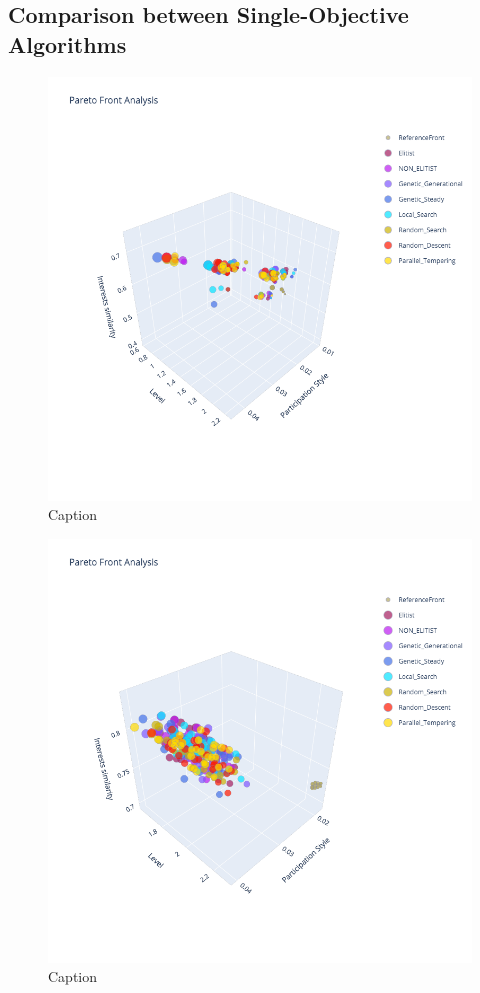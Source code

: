 \subsection{Comparison between Single-Objective Algorithms}

\begin{figure}
    \centering
    \includegraphics[width=\textwidth]{images/3d_soa_20.png}
    \caption{Caption}
    \label{fig:my_label}
\end{figure}

\begin{figure}
    \centering
    \includegraphics[width=\textwidth]{images/3d_soa_200.png}
    \caption{Caption}
    \label{fig:my_label}
\end{figure}

